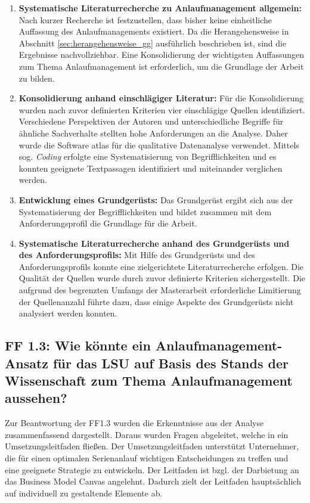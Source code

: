 \begin{enumerate}
 \item \textbf{Systematische Literaturrecherche zu Anlaufmanagement allgemein: } Nach kurzer Recherche ist festzustellen, dass bisher keine einheitliche Auffassung des Anlaufmanagements existiert. Da die Herangehensweise in Abschnitt \ref{sec:herangehensweise_gg} ausführlich beschrieben ist, sind die Ergebnisse nachvollziehbar. Eine Konsolidierung der wichtigsten Auffassungen zum Thema Anlaufmanagement ist erforderlich, um die Grundlage der Arbeit zu bilden. 
 \item \textbf{Konsolidierung anhand einschlägiger Literatur: } Für die Konsolidierung wurden nach zuvor definierten Kriterien vier einschlägige Quellen identifiziert. 
 Verschiedene Perspektiven der Autoren und unterschiedliche Begriffe für ähnliche Sachverhalte stellten hohe Anforderungen an die Analyse. Daher wurde die Software \gls{atlas} für die qualitative Datenanalyse verwendet. Mittels sog. \textit{Coding} erfolgte eine Systematisierung von Begrifflichkeiten und es konnten geeignete Textpassagen identifiziert und miteinander verglichen werden. 
 \item \textbf{Entwicklung eines Grundgerüsts: } Das Grundgerüst ergibt sich aus der Systematisierung der Begrifflichkeiten und bildet zusammen mit dem Anforderungsprofil die Grundlage für die Arbeit. 
 \item \textbf{Systematische Literaturrecherche anhand des Grundgerüsts und des Anforderungsprofils: } Mit Hilfe des Grundgerüsts und des Anforderungsprofils konnte eine zielgerichtete Literaturrecherche erfolgen. Die Qualität der Quellen wurde durch zuvor definierte Kriterien sichergestellt. 
 Die aufgrund des begrenzten Umfangs der Masterarbeit erforderliche Limitierung der Quellenanzahl führte dazu, dass einige Aspekte des Grundgerüsts nicht analysiert werden konnten. %
\end{enumerate}

\subsection*{FF 1.3: Wie könnte ein Anlaufmanagement-Ansatz für das LSU auf Basis des Stands der Wissenschaft zum Thema Anlaufmanagement aussehen?}
Zur Beantwortung der FF1.3 wurden die Erkenntnisse aus der Analyse zusammenfassend dargestellt. Daraus wurden Fragen abgeleitet, welche in ein Umsetzungsleitfaden fließen. Der Umsetzungsleitfaden unterstützt Unternehmer, die für einen optimalen Serienanlauf wichtigen Entscheidungen zu treffen und eine geeignete Strategie zu entwickeln. Der Leitfaden ist bzgl. der Darbietung an das Business Model Canvas %
angelehnt. Dadurch zielt der Leitfaden hauptsächlich auf individuell zu gestaltende Elemente ab.

